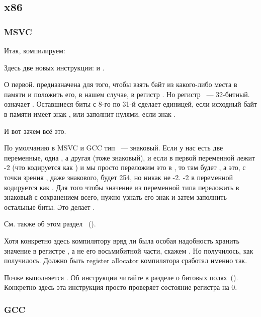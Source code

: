 \subsection{x86}

\subsubsection{\NonOptimizing MSVC}

Итак, компилируем:



Здесь две новых инструкции: \MOVSX и \TEST.

\label{MOVSX}
О первой. \MOVSX предназначена для того, чтобы взять байт из какого-либо места в памяти и положить его, 
в нашем случае, в регистр \EDX. 
Но регистр \EDX~--- 32-битный. \MOVSX означает . 
Оставшиеся биты с 8-го по 31-й \MOVSX сделает единицей, если исходный байт в памяти имеет знак , 
или заполнит нулями, если знак .

И вот зачем всё это.

По умолчанию в MSVC и GCC тип \Tchar~--- знаковый. Если у нас есть две переменные, одна \Tchar, а другая \Tint 
(\Tint тоже знаковый), и если в первой переменной лежит -2 (что кодируется как ) и мы просто 
переложим это в \Tint, 
то там будет , а это, с точки зрения \Tint, даже знакового, будет 254, но никак не -2. 
-2 в переменной \Tint кодируется как . Для того чтобы значение  из переменной типа 
\Tchar переложить 
в знаковый \Tint с сохранением всего, нужно узнать его знак и затем заполнить остальные биты. 
Это делает \MOVSX.

См. также об этом раздел
 \q{\IT{\SignedNumbersSectionName}}~().

Хотя конкретно здесь компилятору вряд ли была особая надобность хранить значение \Tchar в регистре \EDX, 
а не его восьмибитной части, скажем \DL. Но получилось, как получилось. Должно быть 
\gls{register allocator} компилятора сработал именно так.

Позже выполняется . 
Об инструкции \TEST читайте в разделе о битовых полях~().
Конкретно здесь эта инструкция просто проверяет состояние регистра \EDX на 0.

\ifdefined\IncludeGCC
\subsubsection{\NonOptimizing GCC}

